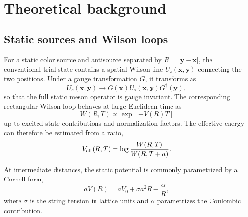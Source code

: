 \chapter{Theoretical background}
\label{chap:theory}

\section{Static sources and Wilson loops}
For a static color source and antisource separated by \(R=|\bm y-\bm x|\), the conventional trial state contains a spatial Wilson line \(U_s(\bm x,\bm y)\) connecting the two positions. Under a gauge transformation \(G\), it transforms as
\begin{equation}
  U_s(\bm x,\bm y) \longrightarrow G(\bm x) U_s(\bm x,\bm y) G^\dagger(\bm y),
\end{equation}
so that the full static meson operator is gauge invariant. The corresponding rectangular Wilson loop behaves at large Euclidean time as
\begin{equation}
  W(R,T) \propto \exp[-V(R)T]
\end{equation}
up to excited-state contributions and normalization factors. The effective energy can therefore be estimated from a ratio,
\begin{equation}
  V_{\mathrm{eff}}(R,T)=\log\frac{W(R,T)}{W(R,T+a)}.
\end{equation}

At intermediate distances, the static potential is commonly parametrized by a Cornell form,
\begin{equation}
  aV(R)=aV_0+\sigma a^2 R-\frac{\alpha}{R},
  \label{eq:cornell}
\end{equation}
where \(\sigma\) is the string tension in lattice units and \(\alpha\) parametrizes the Coulombic contribution.

